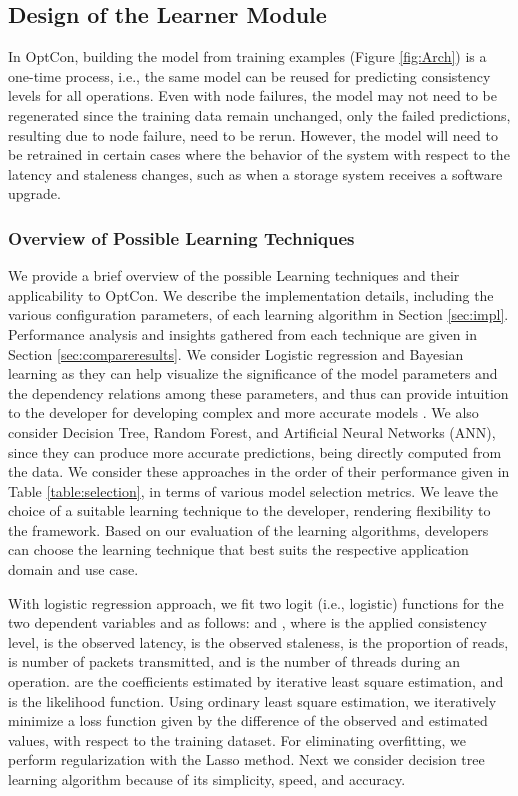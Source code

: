 \documentclass[conference]{IEEEtran}
\begin{document}
\subsection{Design of the Learner Module}\label{sec:approach}
In OptCon, building the model  from training examples (Figure \ref{fig:Arch}) is a one-time process, i.e., the same model can be reused for predicting consistency levels for all operations. Even with node failures, the model may not need to be regenerated since the training data remain unchanged, only the failed predictions, resulting due to node failure, need to be rerun.
 However, the model will need to be retrained in certain cases where the behavior of the system with respect to
 the latency and staleness changes, such as when a storage system receives a software upgrade. \subsubsection{Overview of Possible Learning Techniques}\label{sec:strategies}
We provide a brief overview of the possible Learning techniques and their applicability to OptCon. We describe the implementation details, including the various configuration parameters, of each learning algorithm in Section \ref{sec:impl}. Performance analysis and insights gathered from each technique are given in Section \ref{sec:compareresults}.  We consider Logistic regression and Bayesian learning as they can help  visualize the significance of the model parameters and the dependency relations among these parameters, and thus can provide intuition to the developer for developing complex and more accurate models \cite{Flach:2012:MLA:2490546}.
We also consider Decision Tree, Random Forest, and Artificial Neural Networks (ANN), since they can produce more accurate predictions, being directly computed from the data.
    We consider these approaches in the order of their performance given in Table \ref{table:selection}, in terms of various model selection metrics. We leave the choice of a suitable learning technique to the developer, rendering flexibility to the framework. Based on our evaluation of the learning algorithms, developers can choose the learning technique that best suits the respective application domain and use case.  \par With logistic regression approach, we fit two logit (i.e., logistic) functions for the two dependent variables   and  as follows:  and , where  is the applied consistency level,  is the observed latency,  is the observed staleness,  is the proportion of reads,  is number of packets transmitted, and  is the number of threads during an operation.  are the coefficients estimated by iterative least square estimation, and  is the likelihood function. Using ordinary least square estimation, we iteratively minimize a loss function given by the difference of the observed and estimated values, with respect to the training dataset. For eliminating overfitting, we perform  regularization with the Lasso method.  Next we consider decision tree learning algorithm because of its simplicity, speed, and accuracy.
\end{document}
